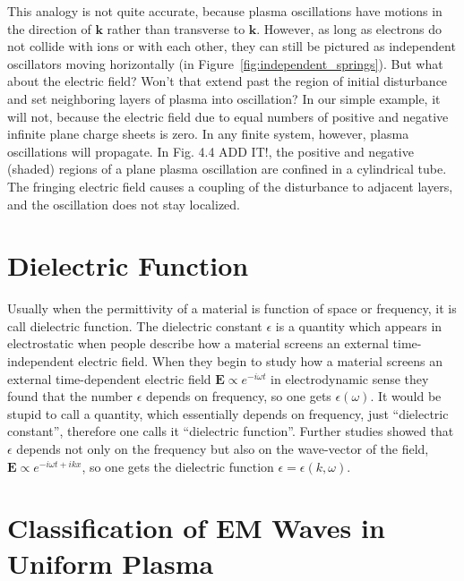 \documentclass[
  notoc %
]{tufte-book}
\begin{document}
This analogy is not quite accurate, because plasma oscillations have
motions in the direction of \(\mathbf{k}\) rather than transverse to
\(\mathbf{k}\). However, as long as electrons do not collide with ions
or with each other, they can still be pictured as independent
oscillators moving horizontally (in
Figure~\ref{fig:independent_springs}). But what about the electric
field? Won't that extend past the region of initial disturbance and set
neighboring layers of plasma into oscillation? In our simple example, it
will not, because the electric field due to equal numbers of positive
and negative infinite plane charge sheets is zero. In any finite system,
however, plasma oscillations will propagate. In Fig. 4.4 ADD IT!, the
positive and negative (shaded) regions of a plane plasma oscillation are
confined in a cylindrical tube. The fringing electric field causes a
coupling of the disturbance to adjacent layers, and the oscillation does
not stay localized.

\hypertarget{dielectric-function}{%
\section{Dielectric Function}\label{dielectric-function}}

Usually when the permittivity of a material is function of space or
frequency, it is call dielectric function. The dielectric constant
\(\epsilon\) is a quantity which appears in electrostatic when people
describe how a material screens an external time-independent electric
field. When they begin to study how a material screens an external
time-dependent electric field \(\mathbf{E}\propto e^{-i\omega t}\) in
electrodynamic sense they found that the number \(\epsilon\) depends on
frequency, so one gets \(\epsilon(\omega)\). It would be stupid to call
a quantity, which essentially depends on frequency, just ``dielectric
constant'', therefore one calls it ``dielectric function''. Further
studies showed that \(\epsilon\) depends not only on the frequency but
also on the wave-vector of the field,
\(\mathbf{E}\propto e^{-i\omega t +ikx}\), so one gets the dielectric
function \(\epsilon=\epsilon(k,\omega)\).

\hypertarget{classification-of-em-waves-in-uniform-plasma}{%
\section{Classification of EM Waves in Uniform
Plasma}\label{classification-of-em-waves-in-uniform-plasma}}
\end{document}
